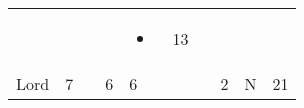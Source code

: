\documentclass[12pt]{article}
\begin{document}
\begin{longtable}[]{@{}llllllllll@{}}
\begin{minipage}[t]{0.06\columnwidth}
\strut\end{minipage} &
\begin{minipage}[t]{0.06\columnwidth}\raggedright\strut
\strut\end{minipage} &
\begin{minipage}[t]{0.06\columnwidth}\raggedright\strut
\strut\end{minipage} &
\begin{minipage}[t]{0.06\columnwidth}\raggedright\strut
\strut\end{minipage} &
\begin{minipage}[t]{0.07\columnwidth}\raggedright\strut
\begin{itemize}
\item
\end{itemize}
\strut\end{minipage} &
\begin{minipage}[t]{0.08\columnwidth}\raggedright\strut
13
\strut\end{minipage}\tabularnewline
\begin{minipage}[t]{0.13\columnwidth}\raggedright\strut
Lord
\strut\end{minipage} &
\begin{minipage}[t]{0.06\columnwidth}\raggedright\strut
7
\strut\end{minipage} &
\begin{minipage}[t]{0.06\columnwidth}\raggedright\strut
\strut\end{minipage} &
\begin{minipage}[t]{0.06\columnwidth}\raggedright\strut
6
\strut\end{minipage} &
\begin{minipage}[t]{0.06\columnwidth}\raggedright\strut
6
\strut\end{minipage} &
\begin{minipage}[t]{0.06\columnwidth}\raggedright\strut
\strut\end{minipage} &
\begin{minipage}[t]{0.06\columnwidth}\raggedright\strut
\strut\end{minipage} &
\begin{minipage}[t]{0.06\columnwidth}\raggedright\strut
2
\strut\end{minipage} &
\begin{minipage}[t]{0.07\columnwidth}\raggedright\strut
N
\strut\end{minipage} &
\begin{minipage}[t]{0.08\columnwidth}\raggedright\strut
21
\strut\end{minipage}\tabularnewline

\end{longtable}
\end{document}
